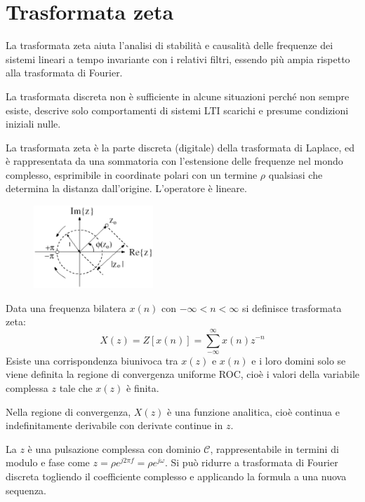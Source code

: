 \section{Trasformata zeta}
La trasformata zeta aiuta l'analisi di stabilità e causalità delle frequenze dei sistemi lineari a tempo invariante con i relativi filtri, essendo più ampia rispetto alla trasformata di Fourier. 

La trasformata discreta non è sufficiente in alcune situazioni perché non sempre esiste, descrive solo comportamenti di sistemi LTI scarichi e presume condizioni iniziali nulle.

La trasformata zeta è la parte discreta (digitale) della trasformata di Laplace, ed è rappresentata da una sommatoria con l'estensione delle frequenze nel mondo complesso, esprimibile in coordinate polari con un termine $\rho$ qualsiasi che determina la distanza dall'origine. L'operatore è lineare.

\begin{figure}
	\vspace{-15pt}
	\includegraphics[width=0.4\textwidth]{Lezioni/Immagini/zeta}
	\vspace{-40pt}
\end{figure}

Data una frequenza bilatera $x(n)$ con $-\infty < n < \infty$ si definisce trasformata zeta:
$$X(z) = Z[x(n)] = \sum_{-\infty}^{\infty} x(n)z^{-n}$$
Esiste una corrispondenza biunivoca tra $x(z)$ e $x(n)$ e i loro domini solo se viene definita la regione di convergenza uniforme ROC, cioè i valori della variabile complessa $z$ tale che $x(z)$ è finita.

Nella regione di convergenza, $X(z)$ è una funzione analitica, cioè continua e indefinitamente derivabile con derivate continue in $z$.

La $z$ è una pulsazione complessa con dominio $\mathcal{C}$, rappresentabile in termini di modulo e fase come $z = \rho e^{j2\pi f} = \rho e^{j\omega}$. Si può ridurre a trasformata di Fourier discreta togliendo il coefficiente complesso e applicando la formula a una nuova sequenza. 

